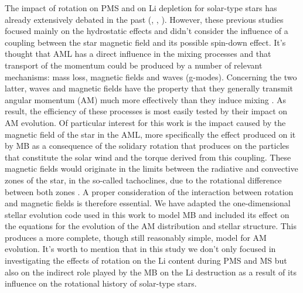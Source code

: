 \documentclass[fleqn,usenatbib]{mnras}
\begin{document}
The impact of rotation on PMS and on Li depletion for solar-type stars has already extensively debated in the past (\citet{Pinsonneault1997}, \citet{Jeffries2004}, \citet{Somers2014}). However, these previous studies focused mainly on the hydrostatic effects and didn't consider the influence of a coupling between the star magnetic field and its possible spin-down effect. It's thought that AML has a direct influence in the mixing processes and that transport of the momentum could be produced by a number of relevant mechanisms: mass loss, magnetic fields and waves (g-modes). Concerning the two latter, waves and magnetic fields have the property that they generally transmit angular momentum (AM) much more effectively than they induce mixing \citep{Denissenkov2007}. As result, the efficiency of these processes is most easily tested by their impact on AM evolution. Of particular interest for this work is the impact caused by the magnetic field of the star in the AML, more specifically the effect produced on it by MB as a consequence of the solidary rotation that produces on the particles that constitute the solar wind and the torque derived from this coupling. These magnetic fields would originate in the limits between the radiative and convective zones of the star, in the so-called tachoclines, due to the rotational difference between both zones \citep{Guerrero2016}. A proper consideration of the interaction between rotation and magnetic fields is therefore essential. We have adapted the one-dimensional stellar evolution code used in this work to model MB and included its effect on the equations for the evolution of the AM distribution and stellar structure. This produces a more complete, though still reasonably simple, model for AM evolution. It's worth to mention that in this study we don't only focused in investigating the effects of rotation on the Li content during PMS and MS but also on the indirect role played by the MB on the Li destruction as a result of its influence on the rotational history of solar-type stars.\par
\end{document}
